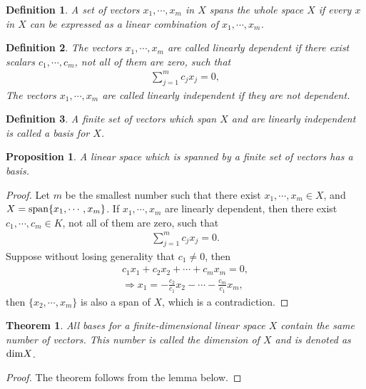 \documentclass[10pt]{book}
\newtheorem{definition}{Definition}[chapter]
\newtheorem{theorem}{Theorem}[chapter]
\newtheorem{proposition}{Proposition}[chapter]
\theoremstyle{definition}
\numberwithin{equation}{chapter}
\begin{document}
\begin{definition}
A set of vectors $x_1,\cdots, x_m$ in $X$ spans the whole space $X$ if every $x$ in $X$ can be expressed as a linear combination of $x_1,\cdots, x_m$.
\end{definition}

\begin{definition}
The vectors $x_1,\cdots, x_m$ are called linearly dependent if there exist scalars $c_1,\cdots, c_m$, not all of them are zero, such that
\begin{align*}
    \sum^m_{j=1} c_j x_j = 0,
\end{align*}
The vectors $x_1,\cdots, x_m$ are called linearly independent if they are not dependent. 
\end{definition}

\medskip

\begin{definition}
A finite set of vectors which span $X$ and are linearly independent is called a basis for $X$.
\end{definition}

\medskip

\begin{proposition}
A linear space which is spanned by a finite set of vectors has a basis.
\end{proposition}
\begin{proof}
Let $m$ be the smallest number such that there exist $x_1,\cdots,x_m \in X$, and $X = {\rm span}\{x_1,\cdots,x_m\}$. If $x_1,\cdots,x_m$ are linearly dependent, then there exist $c_1,\cdots,c_m\in K$, not all of them are zero, such that
\begin{align*}
    \sum^m_{j=1}c_j x_j = 0.
\end{align*}
Suppose without losing generality that $c_1 \neq 0$, then 
\begin{align*}
    c_1 x_1 + c_2 x_2 + \cdots + c_m x_m = 0,\\
    \Rightarrow x_1 = -\frac{c_2}{c_1}x_2 - \cdots - \frac{c_m}{c_1}x_m,
\end{align*}
then $\{x_2,\cdots,x_m\}$ is also a span of $X$, which is a contradiction.
\end{proof}

\medskip

\begin{theorem}
All bases for a finite-dimensional linear space $X$ contain the
same number of vectors. This number is called the dimension of $X$ and is denoted as ${\rm dim} X$.
\end{theorem}
\begin{proof}
The theorem follows from the lemma below.
\end{proof}
\end{document}
